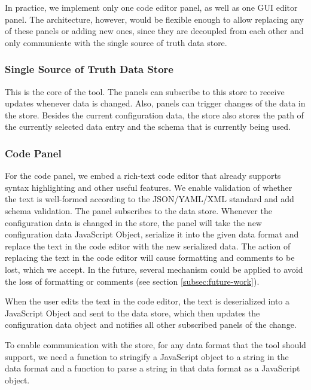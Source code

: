 In practice, we implement only one code editor panel, as well as one GUI editor panel. 
The architecture, however, would be flexible enough to allow replacing any of these panels or adding new ones, since they are decoupled from each other and only communicate with the single source of truth data store.



\subsubsection{Single Source of Truth Data Store}
This is the core of the tool.
The panels can subscribe to this store to receive updates whenever data is changed.
Also, panels can trigger changes of the data in the store.
Besides the current configuration data, the store also stores the path of the currently selected data entry and the schema that is currently being used.


\subsubsection{Code Panel}\label{subsubsec:design_text_editor_panel} 
For the code panel, we embed a rich-text code editor that already supports syntax highlighting and other useful features.
We enable validation of whether the text is well-formed according to the JSON/YAML/XML standard and add schema validation.
The panel subscribes to the data store.
Whenever the configuration data is changed in the store, the panel will take the new configuration data JavaScript Object, serialize it into the given data format and replace the text in the code editor with the new serialized data.
The action of replacing the text in the code editor will cause formatting and comments to be lost, which we accept.
In the future, several mechanism could be applied to avoid the loss of formatting or comments (see section \ref{subsec:future-work}).

When the user edits the text in the code editor, the text is deserialized into a JavaScript Object and sent to the data store, which then updates the configuration data object and notifies all other subscribed panels of the change.


To enable communication with the store, for any data format that the tool should support, we need a function to stringify a JavaScript object to a string in the data format and a function to parse a string in that data format as a JavaScript object.


